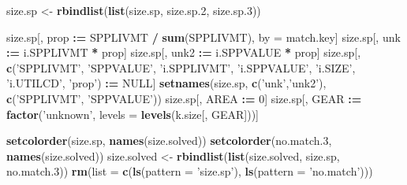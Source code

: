 \documentclass[]{article}
\newenvironment{Shaded}{\begin{snugshade}}{\end{snugshade}}
\newcommand{\KeywordTok}[1]{\textcolor[rgb]{0.13,0.29,0.53}{\textbf{#1}}}
\newcommand{\DataTypeTok}[1]{\textcolor[rgb]{0.13,0.29,0.53}{#1}}
\newcommand{\DecValTok}[1]{\textcolor[rgb]{0.00,0.00,0.81}{#1}}
\newcommand{\StringTok}[1]{\textcolor[rgb]{0.31,0.60,0.02}{#1}}
\newcommand{\OtherTok}[1]{\textcolor[rgb]{0.56,0.35,0.01}{#1}}
\newcommand{\OperatorTok}[1]{\textcolor[rgb]{0.81,0.36,0.00}{\textbf{#1}}}
\newcommand{\ErrorTok}[1]{\textcolor[rgb]{0.64,0.00,0.00}{\textbf{#1}}}
\newcommand{\NormalTok}[1]{#1}
\begin{document}
\begin{Shaded}
\begin{Highlighting}[]
\NormalTok{  size.sp <-}\StringTok{ }\KeywordTok{rbindlist}\NormalTok{(}\KeywordTok{list}\NormalTok{(size.sp, size.sp.}\DecValTok{2}\NormalTok{, size.sp.}\DecValTok{3}\NormalTok{))}
  
\NormalTok{  size.sp[, prop }\OperatorTok{:}\ErrorTok{=}\StringTok{ }\NormalTok{SPPLIVMT }\OperatorTok{/}\StringTok{ }\KeywordTok{sum}\NormalTok{(SPPLIVMT), by =}\StringTok{ }\NormalTok{match.key]}
\NormalTok{  size.sp[, unk  }\OperatorTok{:}\ErrorTok{=}\StringTok{ }\NormalTok{i.SPPLIVMT }\OperatorTok{*}\StringTok{ }\NormalTok{prop]}
\NormalTok{  size.sp[, unk2 }\OperatorTok{:}\ErrorTok{=}\StringTok{ }\NormalTok{i.SPPVALUE }\OperatorTok{*}\StringTok{ }\NormalTok{prop]}
\NormalTok{  size.sp[, }\KeywordTok{c}\NormalTok{(}\StringTok{'SPPLIVMT'}\NormalTok{, }\StringTok{'SPPVALUE'}\NormalTok{, }\StringTok{'i.SPPLIVMT'}\NormalTok{, }\StringTok{'i.SPPVALUE'}\NormalTok{, }\StringTok{'i.SIZE'}\NormalTok{, }
              \StringTok{'i.UTILCD'}\NormalTok{, }\StringTok{'prop'}\NormalTok{) }\OperatorTok{:}\ErrorTok{=}\StringTok{ }\OtherTok{NULL}\NormalTok{]}
  \KeywordTok{setnames}\NormalTok{(size.sp, }\KeywordTok{c}\NormalTok{(}\StringTok{'unk'}\NormalTok{,}\StringTok{'unk2'}\NormalTok{), }\KeywordTok{c}\NormalTok{(}\StringTok{'SPPLIVMT'}\NormalTok{, }\StringTok{'SPPVALUE'}\NormalTok{))}
\NormalTok{  size.sp[, AREA }\OperatorTok{:}\ErrorTok{=}\StringTok{ }\DecValTok{0}\NormalTok{]}
\NormalTok{  size.sp[, GEAR }\OperatorTok{:}\ErrorTok{=}\StringTok{ }\KeywordTok{factor}\NormalTok{(}\StringTok{'unknown'}\NormalTok{, }\DataTypeTok{levels =} \KeywordTok{levels}\NormalTok{(k.size[, GEAR]))]}
  
  \KeywordTok{setcolorder}\NormalTok{(size.sp,    }\KeywordTok{names}\NormalTok{(size.solved))}
  \KeywordTok{setcolorder}\NormalTok{(no.match.}\DecValTok{3}\NormalTok{, }\KeywordTok{names}\NormalTok{(size.solved))}
\NormalTok{  size.solved <-}\StringTok{ }\KeywordTok{rbindlist}\NormalTok{(}\KeywordTok{list}\NormalTok{(size.solved, size.sp, no.match.}\DecValTok{3}\NormalTok{))}
  \KeywordTok{rm}\NormalTok{(}\DataTypeTok{list =} \KeywordTok{c}\NormalTok{(}\KeywordTok{ls}\NormalTok{(}\DataTypeTok{pattern =} \StringTok{'size.sp'}\NormalTok{), }\KeywordTok{ls}\NormalTok{(}\DataTypeTok{pattern =} \StringTok{'no.match'}\NormalTok{)))}
  

\end{Highlighting}
\end{Shaded}
\end{document}

